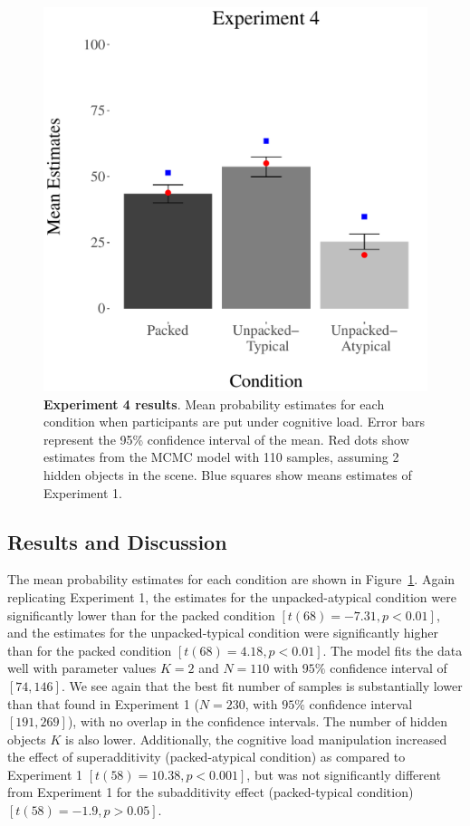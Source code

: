 \begin{figure}[ht!]
\centering
\includegraphics[scale=0.5]{figures/estimates4.pdf}
\caption{\textbf{Experiment 4 results}. Mean probability estimates for each condition when participants are put under cognitive load. Error bars represent the 95\% confidence interval of the mean. Red dots show estimates from the MCMC model with 110 samples, assuming 2 hidden objects in the scene. Blue squares show means estimates of Experiment 1.}
\label{fig:results4}
\end{figure}

\subsection{Results and Discussion}

The mean probability estimates for each condition are shown in Figure~\ref{fig:results4}. Again replicating Experiment 1, the estimates for the unpacked-atypical condition were significantly lower than for the packed condition $[t(68)=-7.31, p<0.01]$, and the estimates for the unpacked-typical condition were significantly higher than for the packed condition $[t(68)= 4.18, p<0.01]$. 
The model fits the data well with parameter values $K = 2$ and $N = 110$ with $95\%$ confidence interval of $[74, 146]$. We see again that the best fit number of samples is substantially lower than that found in Experiment 1 ($N = 230$, with $95\%$ confidence interval $[191, 269]$), with no overlap in the confidence intervals. 
The number of hidden objects $K$ is also lower. Additionally, the cognitive load manipulation increased the effect of superadditivity (packed-atypical condition) as compared to Experiment 1 $[t(58)=10.38, p<0.001]$, but was not significantly different from Experiment 1 for the subadditivity effect (packed-typical condition) $[t(58)=-1.9, p>0.05]$. 

